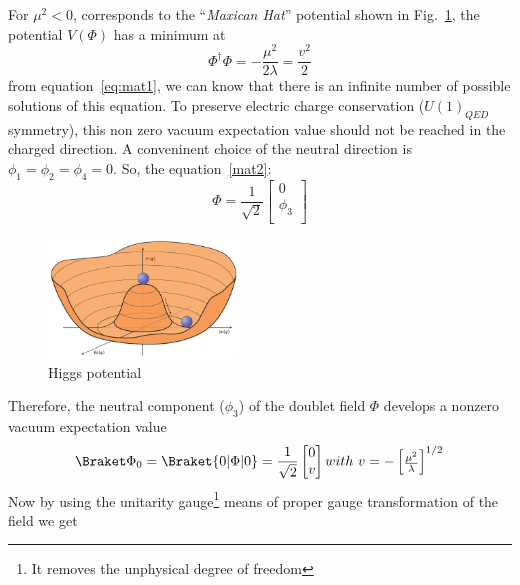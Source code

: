 For $\mu^2<0$, corresponds to the ``\textit{Maxican Hat}'' potential shown in Fig.~\ref{fig:higgsPotential}, the potential $V(\Phi)$ has a minimum at
\begin{equation}
    \Phi^{\dagger}\Phi = -\frac{\mu^2}{2\lambda}=\frac{v^2}{2}
\end{equation}
from equation~\ref{eq:mat1}, we can know that there is an infinite number of possible solutions of this equation. To preserve electric charge conservation ($U(1)_{QED}$ symmetry), this non zero vacuum expectation value should not be reached in the charged direction. A conveninent choice of the neutral direction is $\phi_1 = \phi_2 = \phi_4 = 0$. So, the equation~\ref{mat2}:
\begin{equation}
    \Phi=\frac{1}{\sqrt{2}}
        \begin{bmatrix}
        0   \\
        \phi_3  \\
        \end{bmatrix}
\end{equation}
\begin{figure}[!htbp]
    \centering
    \includegraphics[width=0.45\textwidth]{figures/Intro/higgspotential.png}
    \caption{Higgs potential~\cite{Ellis2015}}
    \label{fig:higgsPotential}
\end{figure}
Therefore, the neutral component ($\phi_3$) of the doublet field $\Phi$ develops a nonzero vacuum expectation value
\begin{equation}
    {\Braket\Phi}_0 = \Braket{0|\Phi|0}=\frac{1}{\sqrt{2}}
        \begin{bmatrix}
        0   \\
        v   \\
        \end{bmatrix}
        with~
        v=-
        \begin{bmatrix}
        \frac{\mu^2}{\lambda}
        \end{bmatrix}
        ^{1/2}
\end{equation}
Now by using the unitarity gauge\footnote{It removes the unphysical degree of freedom} means of proper gauge transformation of the field we get
